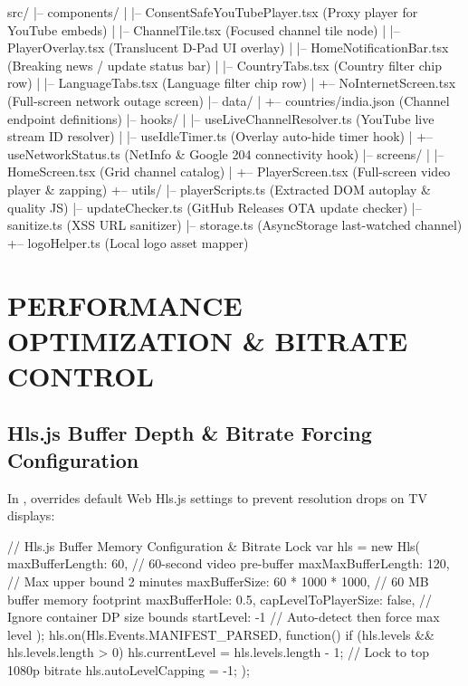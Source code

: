 \documentclass[12pt, a4paper, oneside, openany]{report}
\newcommand{\code}[1]{%
  \leavevmode\penalty0%
  \begingroup
  \setlength{\fboxsep}{2pt}%
  \ttfamily\small\color{inlinetext}%
  \colorbox{inlinebg}{\vphantom{Ag}\detokenize{#1}}%
  \endgroup
}
\begin{document}
\begin{codeblock}
\begin{codeblock}
src/
|-- components/
|   |-- ConsentSafeYouTubePlayer.tsx (Proxy player for YouTube embeds)
|   |-- ChannelTile.tsx             (Focused channel tile node)
|   |-- PlayerOverlay.tsx            (Translucent D-Pad UI overlay)
|   |-- HomeNotificationBar.tsx     (Breaking news / update status bar)
|   |-- CountryTabs.tsx             (Country filter chip row)
|   |-- LanguageTabs.tsx            (Language filter chip row)
|   +-- NoInternetScreen.tsx        (Full-screen network outage screen)
|-- data/
|   +-- countries/india.json         (Channel endpoint definitions)
|-- hooks/
|   |-- useLiveChannelResolver.ts   (YouTube live stream ID resolver)
|   |-- useIdleTimer.ts             (Overlay auto-hide timer hook)
|   +-- useNetworkStatus.ts         (NetInfo & Google 204 connectivity hook)
|-- screens/
|   |-- HomeScreen.tsx              (Grid channel catalog)
|   +-- PlayerScreen.tsx            (Full-screen video player & zapping)
+-- utils/
    |-- playerScripts.ts            (Extracted DOM autoplay & quality JS)
    |-- updateChecker.ts            (GitHub Releases OTA update checker)
    |-- sanitize.ts                 (XSS URL sanitizer)
    |-- storage.ts                  (AsyncStorage last-watched channel)
    +-- logoHelper.ts               (Local logo asset mapper)
\endcodeblock

\chapter{PERFORMANCE OPTIMIZATION \& BITRATE CONTROL}

\section{Hls.js Buffer Depth \& Bitrate Forcing Configuration}
In \code{src/utils/playerScripts.ts}, \code{getHlsHtml()} overrides default Web Hls.js settings to prevent resolution drops on TV displays:

\begin{codeblock}
// Hls.js Buffer Memory Configuration & Bitrate Lock
var hls = new Hls({
  maxBufferLength: 60,            // 60-second video pre-buffer
  maxMaxBufferLength: 120,        // Max upper bound 2 minutes
  maxBufferSize: 60 * 1000 * 1000, // 60 MB buffer memory footprint
  maxBufferHole: 0.5,
  capLevelToPlayerSize: false,    // Ignore container DP size bounds
  startLevel: -1                  // Auto-detect then force max level
});
hls.on(Hls.Events.MANIFEST_PARSED, function() {
  if (hls.levels && hls.levels.length > 0) {
    hls.currentLevel = hls.levels.length - 1; // Lock to top 1080p bitrate
    hls.autoLevelCapping = -1;
  }
});
\endcodeblock


\end{codeblock}
\end{codeblock}
\end{codeblock}
\end{document}

